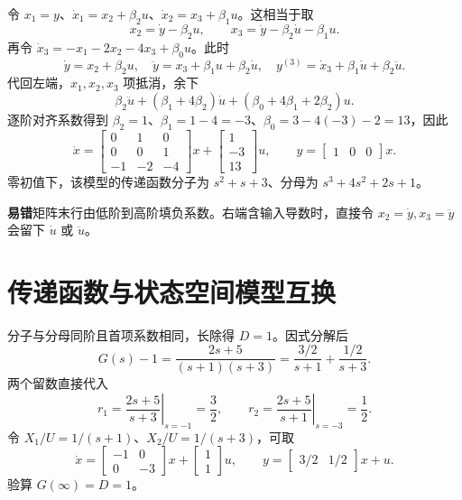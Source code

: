 

\sol 令 $x_1=y$、$\dot x_1=x_2+\beta_2 u$、$\dot x_2=x_3+\beta_1u$。这相当于取
\[
x_2=\dot y-\beta_2 u,\qquad
x_3=\ddot y-\beta_2\dot u-\beta_1 u.
\]
再令 $\dot x_3=-x_1-2x_2-4x_3+\beta_0u$。此时
\[
\dot y=x_2+\beta_2u,\quad
\ddot y=x_3+\beta_1u+\beta_2\dot u,\quad
y^{(3)}=\dot x_3+\beta_1\dot u+\beta_2\ddot u.
\]
代回左端，$x_1,x_2,x_3$ 项抵消，余下
\[
\beta_2\ddot u+(\beta_1+4\beta_2)\dot u+
(\beta_0+4\beta_1+2\beta_2)u.
\]
逐阶对齐系数得到 $\beta_2=1$、$\beta_1=1-4=-3$、$\beta_0=3-4(-3)-2=13$，因此
\[
\dot x=
\begin{bmatrix}0&1&0\\0&0&1\\-1&-2&-4\end{bmatrix}x+
\begin{bmatrix}1\\-3\\13\end{bmatrix}u,\qquad
y=\begin{bmatrix}1&0&0\end{bmatrix}x .
\]
零初值下，该模型的传递函数分子为 $s^2+s+3$、分母为 $s^3+4s^2+2s+1$。

\noindent\textbf{易错}\quad 矩阵末行由低阶到高阶填负系数。右端含输入导数时，直接令 $x_2=\dot y,x_3=\ddot y$ 会留下 $\dot u$ 或 $\ddot u$。

\section{传递函数与状态空间模型互换}



\sol 分子与分母同阶且首项系数相同，长除得 $D=1$。因式分解后
\[
G(s)-1=\frac{2s+5}{(s+1)(s+3)}
=\frac{3/2}{s+1}+\frac{1/2}{s+3}.
\]
两个留数直接代入
\[
r_1=\left.\frac{2s+5}{s+3}\right|_{s=-1}=\frac32,\qquad
r_2=\left.\frac{2s+5}{s+1}\right|_{s=-3}=\frac12.
\]令 $X_1/U=1/(s+1)$、$X_2/U=1/(s+3)$，可取
\[
\dot x=\begin{bmatrix}-1&0\\0&-3\end{bmatrix}x+
\begin{bmatrix}1\\1\end{bmatrix}u,\qquad
y=\begin{bmatrix}3/2&1/2\end{bmatrix}x+u.
\]
验算 $G(\infty)=D=1$。

